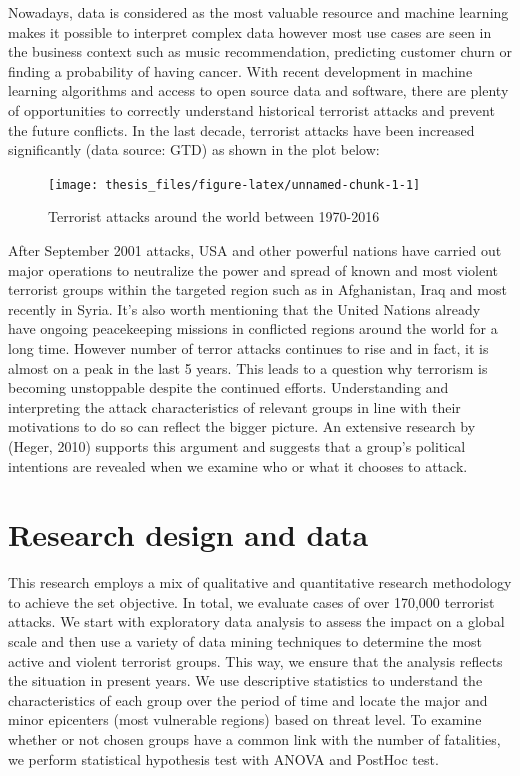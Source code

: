 \documentclass[11pt,oneside,a4paper]{reedthesis}
\begin{document}
Nowadays, data is considered as the most valuable resource and machine
learning makes it possible to interpret complex data however most use
cases are seen in the business context such as music recommendation,
predicting customer churn or finding a probability of having cancer.
With recent development in machine learning algorithms and access to
open source data and software, there are plenty of opportunities to
correctly understand historical terrorist attacks and prevent the future
conflicts. In the last decade, terrorist attacks have been increased
significantly (data source: GTD) as shown in the plot below:
\begin{figure}
\texttt{[image: thesis\_files/figure-latex/unnamed-chunk-1-1]} \caption{Terrorist attacks around the world between 1970-2016}\label{fig:unnamed-chunk-1}
\end{figure}
After September 2001 attacks, USA and other powerful nations have
carried out major operations to neutralize the power and spread of known
and most violent terrorist groups within the targeted region such as in
Afghanistan, Iraq and most recently in Syria. It's also worth mentioning
that the United Nations already have ongoing peacekeeping missions in
conflicted regions around the world for a long time. However number of
terror attacks continues to rise and in fact, it is almost on a peak in
the last 5 years. This leads to a question why terrorism is becoming
unstoppable despite the continued efforts. Understanding and
interpreting the attack characteristics of relevant groups in line with
their motivations to do so can reflect the bigger picture. An extensive
research by (Heger, 2010) supports this argument and suggests that a
group's political intentions are revealed when we examine who or what it
chooses to attack.

\hypertarget{research-design-and-data}{\section*{Research design and
data}\label{research-design-and-data}}

This research employs a mix of qualitative and quantitative research
methodology to achieve the set objective. In total, we evaluate cases of
over 170,000 terrorist attacks. We start with exploratory data analysis
to assess the impact on a global scale and then use a variety of data
mining techniques to determine the most active and violent terrorist
groups. This way, we ensure that the analysis reflects the situation in
present years. We use descriptive statistics to understand the
characteristics of each group over the period of time and locate the
major and minor epicenters (most vulnerable regions) based on threat
level. To examine whether or not chosen groups have a common link with
the number of fatalities, we perform statistical hypothesis test with
ANOVA and PostHoc test.
\end{document}
